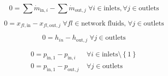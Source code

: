 \begin{equation}
\label{eq:Splitter_mass_flow_constraints}
0 =\sum\dot{m}_{\mathrm{in},i}-\sum\dot{m}_{\mathrm{out},j}\;\forall i \in \text{inlets}, \forall j \in \text{outlets}
\end{equation}

\begin{equation}
\label{eq:Splitter_fluid_constraints}
0 = x_{fl\mathrm{,in}} - x_{fl\mathrm{,out,}j}\; \forall fl \in \text{network fluids,} \; \forall j \in\text{outlets}
\end{equation}

\begin{equation}
\label{eq:Splitter_energy_balance_constraints}
0=h_{in}-h_{\mathrm{out,}j}\;\forall j \in\text{outlets}
\end{equation}

\begin{equation}
\label{eq:Splitter_pressure_constraints}
\begin{split}
0 = p_\mathrm{in,1} - p_{\mathrm{in,}i} & \; \forall i \in \text{inlets} \setminus \left\lbrace 1\right\rbrace\\
0 = p_\mathrm{in,1} - p_{\mathrm{out,}j} & \; \forall j \in \text{outlets}\\
\end{split}
\end{equation}


